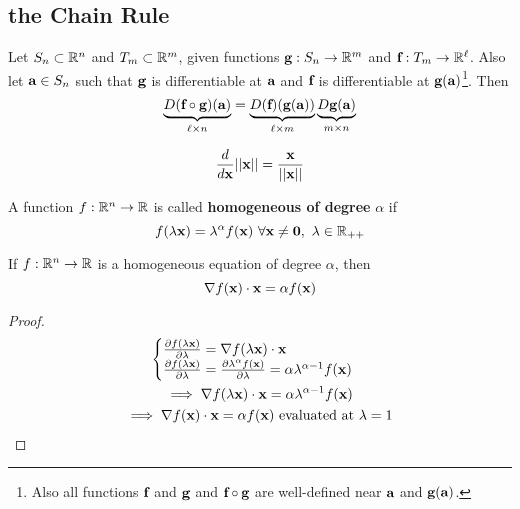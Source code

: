 \documentclass[11pt]{article}
\newcommand{\vef}[0]{\ve{f}}
\newcommand{\veg}[0]{\ve{g}}
\begin{document}
		\subsection{the Chain Rule}
			\begin{theorem}
				Let $S_n \subset \mathbb{R}^n$ and $T_m \subset \mathbb{R}^m$, given functions $\veg: S_n \to \R^m$ and $\vef: T_m \to \R^{\ell}$. Also let $\textbf{a} \in S_n$ such that $\veg$ is differentiable at $\textbf{a}$ and $\vef$ is differentiable at $\veg(\vea)$\footnote{Also all functions $\vef$ and $\veg$ and $\vef \circ \veg$ are well-defined near $\textbf{a}$ and $\veg(\vea)$.}. Then
				\begin{equation}
					\underbrace{D(\vef \circ \veg)(\vea)}_{\ell \times n} 
					= \underbrace{D(\vef)(\veg(\vea))}_{\ell \times m} \underbrace{D\veg(\vea)}_{m \times n}
				\end{equation}
			\end{theorem}
			
			\begin{example}
				\begin{equation}
					\frac{d}{d\textbf{x}} \vert \vert {\textbf{x}} \vert \vert = \frac{\textbf{x}}{\vert \vert {\textbf{x}} \vert \vert}
				\end{equation}
			\end{example}
			
			\begin{definition}
				A function $f: \mathbb{R}^n \to \mathbb{R}$ is called \textbf{homogeneous of degree} $\alpha$ if
				\begin{equation}
					f(\lambda \textbf{x}) = \lambda^\alpha f(\textbf{x})\ \forall \textbf{x} \neq \textbf{0},\ \lambda \in \mathbb{R}_{++}
				\end{equation}
			\end{definition}
			
			\begin{theorem}
				If $f: \mathbb{R}^n \to \mathbb{R}$ is a homogeneous equation of degree $\alpha$, then 
				\begin{equation}
					\nabla f(\textbf{x}) \cdot \textbf{x} = \alpha f(\textbf{x})
				\end{equation}
				\begin{proof}
					\begin{gather}
						\begin{cases}
							\frac{\partial{f(\lambda \textbf{x})}}{\partial{\lambda}} = \nabla f(\lambda \textbf{x}) \cdot \textbf{x} \\
							\frac{\partial{f(\lambda \textbf{x})}}{\partial{\lambda}} = \frac{\partial{\lambda^\alpha f(\textbf{x})}}{\partial{\lambda}} = \alpha \lambda^{\alpha - 1} f(\textbf{x})
						\end{cases} \\
						\implies \nabla f(\lambda \textbf{x}) \cdot \textbf{x} = \alpha \lambda^{\alpha - 1} f(\textbf{x}) \\
						\implies \nabla f(\textbf{x}) \cdot \textbf{x} = \alpha f(\textbf{x}) \text{{ evaluated at }} \lambda = 1
					\end{gather}
				\end{proof}
			\end{theorem}
			
\end{document}
